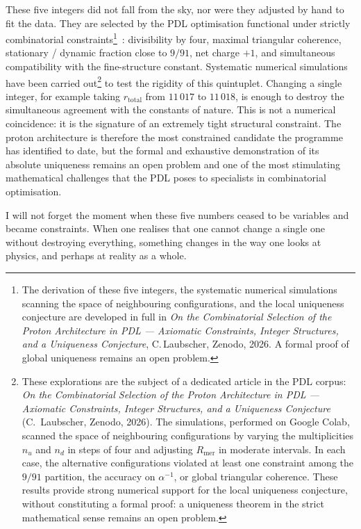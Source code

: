 \documentclass[11pt, a4paper, openright]{book}
\begin{document}
These five integers did not fall from the sky, nor were they adjusted by hand to fit the data. They are selected by the PDL optimisation functional under strictly combinatorial constraints\footnote{The derivation of these five integers, the systematic numerical simulations scanning the space of neighbouring configurations, and the local uniqueness conjecture are developed in full in \textit{On the Combinatorial Selection of the Proton Architecture in PDL --- Axiomatic Constraints, Integer Structures, and a Uniqueness Conjecture}, C.\,Laubscher, Zenodo, 2026. A formal proof of global uniqueness remains an open problem.}~: divisibility by four, maximal triangular coherence, stationary / dynamic fraction close to $9/91$, net charge $+1$, and simultaneous compatibility with the fine-structure constant. Systematic numerical simulations have been carried out\footnote{%
 These explorations are the subject of a dedicated article in the PDL corpus: \emph{On the Combinatorial Selection of the Proton Architecture in PDL — Axiomatic Constraints, Integer Structures, and a Uniqueness Conjecture} (C.~Laubscher, Zenodo, 2026). The simulations, performed on Google Colab, scanned the space of neighbouring configurations by varying the multiplicities $n_u$ and $n_d$ in steps of four and adjusting $R_\text{mer}$ in moderate intervals. In each case, the alternative configurations violated at least one constraint among the $9/91$ partition, the accuracy on $\alpha^{-1}$, or global triangular coherence. These results provide strong numerical support for the local uniqueness conjecture, without constituting a formal proof: a uniqueness theorem in the strict mathematical sense remains an open problem.}
to test the rigidity of this quintuplet. Changing a single integer, for example taking $r_\text{total}$ from $11\,017$ to $11\,018$, is enough to destroy the simultaneous agreement with the constants of nature. This is not a numerical coincidence: it is the signature of an extremely tight structural constraint. The proton architecture is therefore the most constrained candidate the programme has identified to date, but the formal and exhaustive demonstration of its absolute uniqueness remains an open problem and one of the most stimulating mathematical challenges that the PDL poses to specialists in combinatorial optimisation.

\medskip

I will not forget the moment when these five numbers ceased to be variables and became constraints. When one realises that one cannot change a single one without destroying everything, something changes in the way one looks at physics, and perhaps at reality as a whole.
\end{document}
